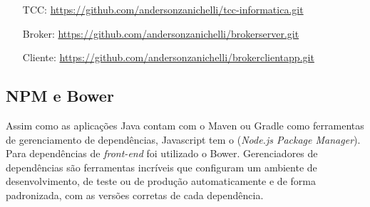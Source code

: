 \begin{footnotesize}
  \begin{itemize}
  \item[TCC:] \url{https://github.com/andersonzanichelli/tcc-informatica.git}
  \item[Broker:] \url{https://github.com/andersonzanichelli/brokerserver.git}
  \item[Cliente:] \url{https://github.com/andersonzanichelli/brokerclientapp.git}
  \end{itemize}
\end{footnotesize}

\subsection{NPM e Bower}
Assim como as aplicações Java contam com o Maven ou Gradle como ferramentas de gerenciamento de dependências, Javascript tem o  (\textit{Node.js Package Manager}). Para dependências de \textit{front-end} foi utilizado o Bower.
Gerenciadores de dependências são ferramentas incríveis que configuram um ambiente de desenvolvimento, de teste ou de produção automaticamente e de forma padronizada, com as versões corretas de cada dependência.